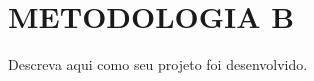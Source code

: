 \section{METODOLOGIA B}
\label{sec:metodologia_b}

Descreva aqui como seu projeto foi desenvolvido. 
